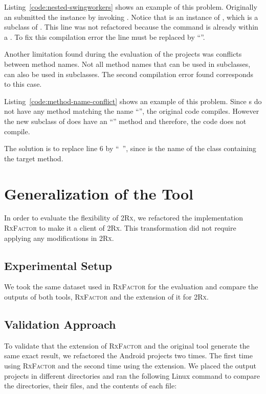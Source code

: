 \documentclass[type=bsc,accentcolor=tud9c]{tudthesis}
\newcommand{\framework}[1]{\textcolor{black!65}{#1}}
\newcommand{\toolcore}{\textsc{2Rx}}
\begin{document}
Listing~\ref{code:nested-swingworkers} shows an example of this problem. Originally an  submitted the instance  by invoking . Notice that  is an instance of , which is a subclass of . This line was not refactored because the command is already within a . To fix this compilation error the line must be replaced by ``''.



Another limitation found during the evaluation of the projects was conflicts between method names. Not all method names that can be used in  subclasses, can also be used in  subclasses. The second compilation error found corresponds to this case. 

Listing~\ref{code:method-name-conflict} shows an example of this problem. Since s do not have any method matching the name ``'', the original code compiles. However the new subclass of  does have an ``'' method and therefore, the code does not compile. 

The solution is to replace line 6 by ``~'', since  is the name of the class containing the target method.



\section{Generalization of the Tool}
In order to evaluate the flexibility of \toolcore{}, we refactored the implementation \textsc{RxFactor} to make it a client of \toolcore{}. This transformation did not require applying any modifications in \toolcore{}.

\subsection{Experimental Setup}
We took the same dataset used in \textsc{RxFactor} for the evaluation and compare the outputs of both tools, \textsc{RxFactor} and the extension of it for \toolcore{}.

\subsection{Validation Approach}
To validate that the extension of \textsc{RxFactor} and the original tool generate the same exact result, we refactored the \framework{Android} projects two times. The first time using \textsc{RxFactor} and the second time using the extension. We placed the output projects in different directories and ran the following Linux command to compare the directories, their files, and the contents of each file:
\end{document}
